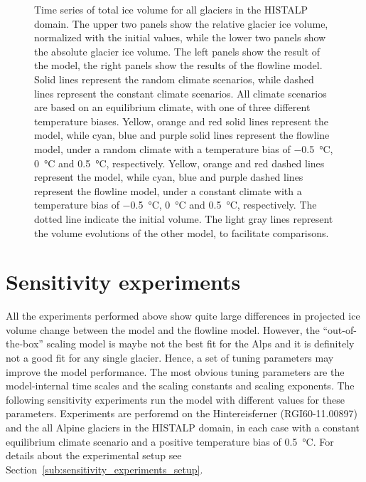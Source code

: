 \begin{figure}[htp]
      \caption{Time series of total ice volume for all glaciers in the HISTALP domain. The upper two panels show the relative glacier ice volume, normalized with the initial values, while the lower two panels show the absolute glacier ice volume. The left panels show the result of the \vas{} model, the right panels show the results of the flowline model. Solid lines represent the random climate scenarios, while dashed lines represent the constant climate scenarios. All climate scenarios are based on an equilibrium climate, with one of three different temperature biases.
      Yellow, orange and red solid lines represent the \vas{} model, while cyan, blue and purple solid lines represent the flowline model, under a random climate with a temperature bias of \SI{-.5}{\celsius}, \SI{0}{\celsius} and \SI{+.5}{\celsius}, respectively. Yellow, orange and red dashed lines represent the \vas{} model, while cyan, blue and purple dashed lines represent the flowline model, under a constant climate with a temperature bias of \SI{-.5}{\celsius}, \SI{0}{\celsius} and \SI{+.5}{\celsius}, respectively. %
      The dotted line indicate the initial volume. The light gray lines represent the volume evolutions of the other model, to facilitate comparisons.}
      \label{fig:histalp_commitment}
    \end{figure}


  \section{Sensitivity experiments} %
  \label{sec:sensitivity_experiments_results}

    All the experiments performed above show quite large differences in projected ice volume change between the \vas{} model and the flowline model. However, the ``out-of-the-box'' scaling model is maybe not the best fit for the Alps and it is definitely not a good fit for any single glacier. Hence, a set of tuning parameters may improve the model performance.
    The most obvious tuning parameters are the model-internal time scales and the scaling constants and scaling exponents. The following sensitivity experiments run the \vas{} model with different values for these parameters. Experiments are perforemd on the Hintereisferner (RGI60-11.00897) and the all Alpine glaciers in the HISTALP domain, in each case with a constant equilibrium climate scenario and a positive temperature bias of \SI{+0.5}{\celsius}. For details about the experimental setup see Section~\ref{sub:sensitivity_experiments_setup}.

